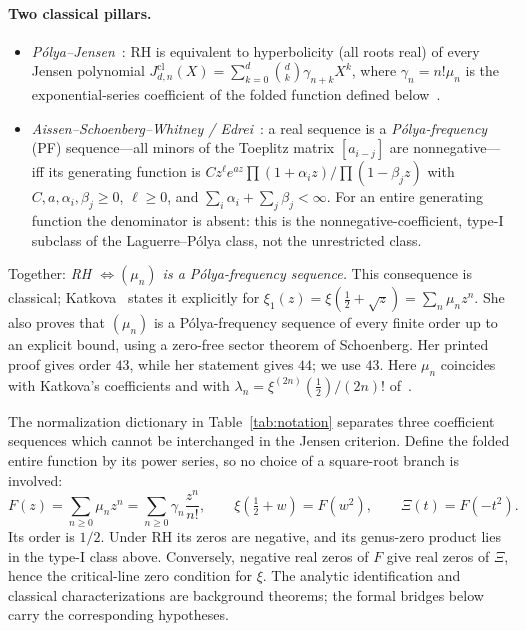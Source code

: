 \documentclass[11pt]{article}
\theoremstyle{plain}
\theoremstyle{definition}
\theoremstyle{remark}
\newcommand{\Xib}{\Xi}
\begin{document}
\paragraph{Two classical pillars.}
\begin{itemize}
  \item \emph{Pólya--Jensen}~\cite{Polya1927,CNV1986}: RH is equivalent to
  hyperbolicity (all roots real) of every Jensen polynomial
  $J^{\mathrm{cl}}_{d,n}(X) = \sum_{k=0}^d \binom{d}{k}\gamma_{n+k} X^k$,
  where $\gamma_n=n!\mu_n$ is the exponential-series coefficient of the
  folded function defined below~\cite{GORTTW}.
  \item \emph{Aissen--Schoenberg--Whitney / Edrei}~\cite{ASW1952,Edrei1953,Karlin1968}:
  a real sequence is a \emph{Pólya-frequency} (PF) sequence---all minors of the
  Toeplitz matrix $[a_{i-j}]$ are nonnegative---iff its generating function is
  $Cz^\ell e^{az}\prod(1+\alpha_i z)/\prod(1-\beta_j z)$ with
  $C,a,\alpha_i,\beta_j\ge 0$, $\ell\ge0$, and
  $\sum_i\alpha_i+\sum_j\beta_j<\infty$. For an entire generating
  function the denominator is absent: this is the nonnegative-coefficient,
  type-I subclass of the Laguerre--Pólya class, not the unrestricted class.
\end{itemize}
Together: \emph{RH $\iff (\mu_n)$ is a Pólya-frequency sequence.} This
consequence is classical; Katkova~\cite{Katkova2007} states it explicitly for
$\xi_1(z)=\xi(\tfrac12+\sqrt z)=\sum_n\mu_n z^n$. She also proves that $(\mu_n)$ is a
Pólya-frequency sequence of every finite order up to an explicit bound, using a
zero-free sector theorem of Schoenberg. Her printed proof gives order $43$, while her
statement gives $44$; we use $43$. Here $\mu_n$ coincides with Katkova's
coefficients and with $\lambda_n=\xi^{(2n)}(\tfrac12)/(2n)!$
of~\cite{LiuMao2026}.

The normalization dictionary in Table~\ref{tab:notation} separates three
coefficient sequences which cannot be interchanged in the Jensen criterion.
Define the folded entire function by its power series, so no choice of a
square-root branch is involved:
\begin{equation}\label{eq:folded}
 F(z)=\sum_{n\ge0}\mu_n z^n=\sum_{n\ge0}\gamma_n\frac{z^n}{n!},
 \qquad \xi(\tfrac12+w)=F(w^2),\qquad \Xib(t)=F(-t^2).
\end{equation}
Its order is $1/2$. Under RH its zeros are negative, and its genus-zero
product lies in the type-I class above. Conversely, negative real zeros of
$F$ give real zeros of $\Xib$, hence the critical-line zero condition for $\xi$.
The analytic identification and classical characterizations are background
theorems; the formal bridges below carry the corresponding hypotheses.
\end{document}
